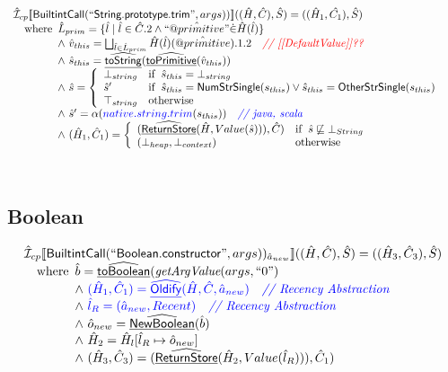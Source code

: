 \[\begin{array}{l}
\hat{\mathcal{I}} _{cp}\llbracket \mbox{\textsf{BuiltintCall}}(``\mbox{\textsf{String.prototype.trim}}",args))\rrbracket((\hat{H},\hat{C}), \hat{S})
  = ((\hat{H}_1, \hat{C_1}), \hat{S})\\
\quad{\rm where}\begin{array}[t]{l} 
  \hat{L}_{prim} = \{ \hat{l} \mid \hat{l} \in \hat{C}.2 \land ``\hat{@primitive}" \dot{\in}\hat{H}(\hat{l}) \}\\
  \land\ \hat{v}_{this} = \bigsqcup_{\hat{l} \in \hat{L}_{prim}} \hat{H}(\hat{l})(\hat{@primitive}).1.2
    \quad\textit{{\color{red}// [[DefaultValue]]??}}\\
  \land\ \hat{s}_{this} = \widehat{\underline{\sf toString}}(\widehat{\underline{\sf toPrimitive}}(\hat{v}_{this}))\\
  \land\ \hat{s} = \left\{\begin{array}{ll}
      \bot_{string} & {\rm if}\begin{array}[t]{l}\hat{s}_{this} = \bot_{string}\end{array}\\
      \hat{s}' & {\rm if}\begin{array}[t]{l}\hat{s}_{this} = \mbox{\textsf{NumStrSingle}}(s_{this}) \lor \hat{s}_{this} = \mbox{\textsf{OtherStrSingle}}(s_{this}) \end{array}\\
      \top_{string} & {\rm otherwise}
    \end{array}\right.\\
  \land\ \hat{s}' = \alpha({\color{blue} native.string.trim}(s_{this}))
    \quad\textit{{\color{blue}// java, scala}}\\
  \land\ (\hat{H}_1, \hat{C}_1) = 
    \left\{\begin{array}{ll}
      (\widehat{\underline{\sf ReturnStore}}(\hat{H}, Value(\hat{s}))), \hat{C})
      & {\rm if}\begin{array}[t]{l}\hat{s} \not\sqsubseteq \bot_{String}\end{array}\\
      (\bot_{heap}, \bot_{context}) & {\rm otherwise} \\
    \end{array}\right.\\
  \end{array}\\
\\\\
\end{array}
\]


\subsection{Boolean}
\[
\begin{array}{l}
\hat{\mathcal{I}} _{cp}\llbracket \mbox{\textsf{BuiltintCall}}(``\mbox{\textsf{Boolean.constructor}}",args))_{\hat{a}_{new}}\rrbracket((\hat{H},\hat{C}), \hat{S})
  = ((\hat{H}_3, \hat{C}_3), \hat{S})\\
\quad{\rm where}\begin{array}[t]{l}
   \hat{b} = \widehat{\underline{\sf toBoolean}}(\emph{getArgValue}(args, ``0")\\
   \land\ \color{blue} (\hat{H}_1, \hat{C}_1) = \widehat{\underline{\sf Oldify}}(\hat{H}, \hat{C}, \hat{a}_{new})
     \quad\textit{{\color{blue}// Recency Abstraction}}\\
   \land\ \color{blue}\hat{l}_{R} = (\hat{a}_{new}, Recent)
     \quad\textit{{\color{blue}// Recency Abstraction}}\\
  \land\ \hat{o}_{new} = \widehat{\underline{\sf NewBoolean}}(\hat{b})\\
  \land\ \hat{H}_2 = \hat{H}_l[\hat{l}_R \mapsto \hat{o}_{new}]\\
  \land\ (\hat{H}_3, \hat{C}_3) = (\widehat{\underline{\sf ReturnStore}}(\hat{H}_2, Value(\hat{l}_R))), \hat{C}_1)
  \end{array}\\
\end{array}
\]


